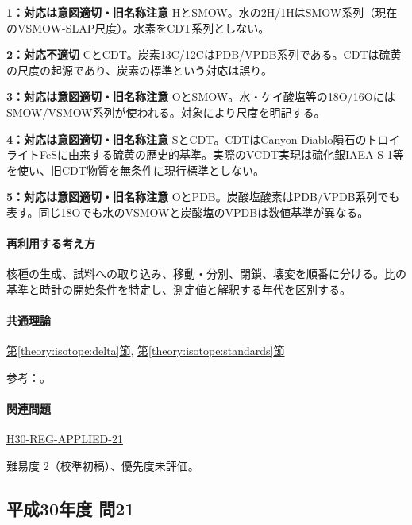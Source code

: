 \noindent\textbf{1：対応は意図適切・旧名称注意} HとSMOW。水の2H/1HはSMOW系列（現在のVSMOW-SLAP尺度）。水素をCDT系列としない。\par

\noindent\textbf{2：対応不適切} CとCDT。炭素13C/12CはPDB/VPDB系列である。CDTは硫黄の尺度の起源であり、炭素の標準という対応は誤り。\par

\noindent\textbf{3：対応は意図適切・旧名称注意} OとSMOW。水・ケイ酸塩等の18O/16OにはSMOW/VSMOW系列が使われる。対象により尺度を明記する。\par

\noindent\textbf{4：対応は意図適切・旧名称注意} SとCDT。CDTはCanyon Diablo隕石のトロイライトFeSに由来する硫黄の歴史的基準。実際のVCDT実現は硫化銀IAEA-S-1等を使い、旧CDT物質を無条件に現行標準としない。\par

\noindent\textbf{5：対応は意図適切・旧名称注意} OとPDB。炭酸塩酸素はPDB/VPDB系列でも表す。同じ18Oでも水のVSMOWと炭酸塩のVPDBは数値基準が異なる。\par

\paragraph{再利用する考え方} 核種の生成、試料への取り込み、移動・分別、閉鎖、壊変を順番に分ける。比の基準と時計の開始条件を特定し、測定値と解釈する年代を区別する。

\paragraph{共通理論} \hyperref[theory:isotope:delta]{第\ref*{theory:isotope:delta}節}, \hyperref[theory:isotope:standards]{第\ref*{theory:isotope:standards}節}

\par 参考：\cite{iso_standards1995,iso_vsmow2,iso_vcdt}。

\paragraph{関連問題} \hyperref[q:h30-reg-applied-21]{H30-REG-APPLIED-21}

\par 難易度 2（校準初稿）、優先度未評価。

\subsection{平成30年度 問21}
\label{q:h30-reg-applied-21}

